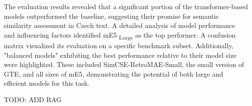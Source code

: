 The evaluation results revealed that a significant portion of the transformer-based models outperformed the baseline, suggesting their promise for semantic similarity assessment in Czech text.
A detailed analysis of model performance and influencing factors identified \ac{mE5} \textsubscript{Large} as the top performer.
A confusion matrix visualized its evaluation on a specific benchmark subset.
Additionally, "balanced models" exhibiting the best performance relative to their model size were highlighted.
These included SimCSE-RetroMAE-Small, the small version of \ac{GTE}, and all sizes of \ac{mE5}, demonstrating the potential of both large and efficient models for this task.


TODO: ADD RAG




